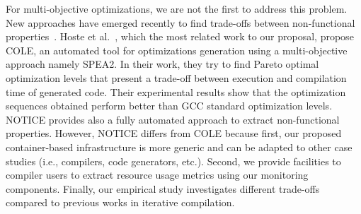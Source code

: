 For multi-objective optimizations, we are not the first to address this problem. New approaches have emerged recently to find trade-offs between non-functional properties~\cite{hoste2008cole,martinez2014multi,lokuciejewski2010multi}. Hoste et al.~\cite{hoste2008cole}, which the most related work to our proposal, propose COLE, an automated tool for optimizations generation using a multi-objective approach namely SPEA2. In their work, they try to find Pareto optimal optimization levels that present a trade-off between execution and compilation time of generated code. Their experimental results show that the optimization sequences obtained perform better than GCC standard optimization levels. NOTICE provides also a fully automated approach to extract non-functional properties. However, NOTICE differs from COLE because first, our proposed container-based infrastructure is more generic and can be adapted to other case studies (i.e., compilers, code generators, etc.). Second, we provide facilities to compiler users to extract resource usage metrics using our monitoring components. Finally, our empirical study investigates different trade-offs compared to previous works in iterative compilation.




